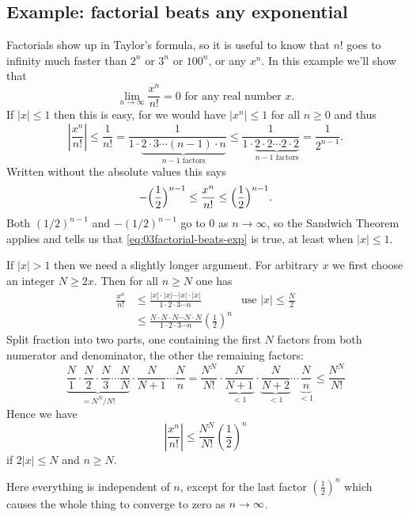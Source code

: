 \subsection{Example: factorial beats any exponential} Factorials show up in %
Taylor's formula, so it is useful to know that $n!$ goes to infinity much
faster than $2^n$ or $3^n$ or $100^n$, or any $x^n$.  In this example we'll
show that 
\begin{equation}
  \lim_{n\to\infty} \frac{x^n}{n!} =0
  \text{ for any real number } x.
  \label{eq:03factorial-beats-exp}
\end{equation}
If $|x|\leq 1$ then this is easy, for we would have $|x^n|\leq1$ for all
$n\geq 0$ and thus
\[
\left|\frac{x^n}{n!}\right|\leq \frac 1{n!}  =\frac
1{1\cdot\underbrace{2\cdot3\cdots (n-1)\cdot n}_{n-1\text{ factors} }} \leq
\frac 1 {1\cdot\underbrace{2\cdot2\cdots2\cdot2}_{n-1\text{ factors} }}
=\frac1{2^{n-1}}.
\]
Written without the absolute values this says
\[
-\Bigl(\frac12\Bigr)^{n-1} \leq \frac{x^n}{n!} 
\leq \Bigl(\frac{1}{2}\Bigr)^{n-1}.
\]
Both $(1/2)^{n-1}$ and $-(1/2)^{n-1}$ go to $0$ as $n\to\infty$, so
the Sandwich Theorem applies and tells us that
\eqref{eq:03factorial-beats-exp} is true, at least when $|x|\leq 1$.

If $|x|>1$ then we need a slightly longer argument.
For arbitrary $x$ we first choose an integer $N\geq 2x$. Then for all
$n\geq N$ one has
\begin{align*}
  \frac{x^n}{n!}  &\leq\frac{|x|\cdot|x|\cdots|x|\cdot|x|} {
  1\cdot2\cdot3\cdots n}
  &\text{use $|x|\leq \frac N2$}\\
  &\leq\frac{N\cdot N\cdot N\cdots N\cdot N} { 1\cdot2\cdot3\cdots n}
  \left(\frac12\right)^n
\end{align*}
Split fraction into two parts, one containing the first $N$ factors from
both numerator and denominator, the other the remaining factors:
\[
\underbrace{\frac{N}1\cdot \frac N2\cdot \frac N3 \cdots \frac
NN}_{=N^N/N!}  \cdot\frac N{N+1}\cdots\frac Nn =\frac{N^N}{N!}\cdot
\underbrace{\frac{N}{N+1}}_{<1}\cdot \underbrace{\frac{ N}{N+2}}_{<1}\cdots
\underbrace{\frac{N}{n}}_{<1} \leq \frac{N^N}{N!}
\]
Hence we have
\[
\left|\frac{x^n}{n!}\right| \leq \frac{N^N}{N!}\left(\frac12\right)^{n}
\]
if $2|x|\leq N$ and $n\geq N$.

Here everything is independent of $n$, except for the last factor
$(\frac12)^{n}$ which causes the whole thing to converge to zero as
$n\to\infty$.


